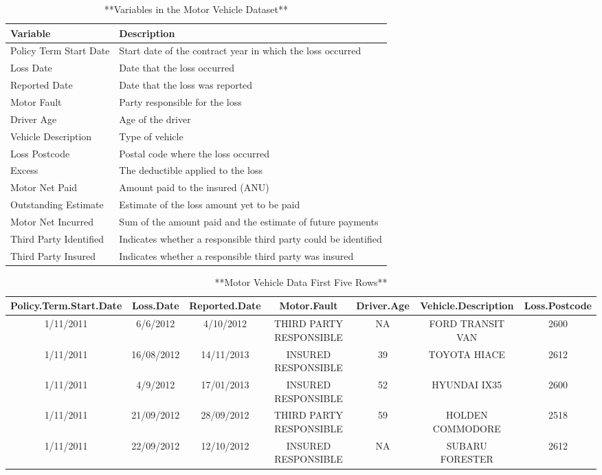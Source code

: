 \documentclass[
]{book}
\begin{document}
\begin{table}

\caption{\label{tab:DescribeAuto}**Variables in the Motor Vehicle Dataset**}
\centering
\begin{tabular}[t]{ll}
\toprule
Variable & Description\\
\midrule
Policy Term Start Date & Start date of the contract year in which the loss occurred\\
Loss Date & Date that the loss occurred\\
Reported Date & Date that the loss was reported\\
Motor Fault & Party responsible for the loss\\
Driver Age & Age of the driver\\
\addlinespace
Vehicle Description & Type of vehicle\\
Loss Postcode & Postal code where the loss occurred\\
Excess & The deductible applied to the loss\\
Motor Net Paid & Amount paid to the insured (ANU)\\
Outstanding Estimate & Estimate of the loss amount yet to be paid\\
\addlinespace
Motor Net Incurred & Sum of the amount paid and the estimate of future payments\\
Third Party Identified & Indicates whether a responsible third party could be identified\\
Third Party Insured & Indicates whether a responsible third party was insured\\
\bottomrule
\end{tabular}
\end{table}

\begin{table}

\caption{\label{tab:PrintNumAuto}**Motor Vehicle  Data First Five Rows**}
\centering
\begin{tabular}[t]{c|c|c|c|c|c|c}
\hline
Policy.Term.Start.Date & Loss.Date & Reported.Date & Motor.Fault & Driver.Age & Vehicle.Description & Loss.Postcode\\
\hline
1/11/2011 & 6/6/2012 & 4/10/2012 & THIRD PARTY RESPONSIBLE & NA & FORD TRANSIT VAN & 2600\\
\hline
1/11/2011 & 16/08/2012 & 14/11/2013 & INSURED RESPONSIBLE & 39 & TOYOTA HIACE & 2612\\
\hline
1/11/2011 & 4/9/2012 & 17/01/2013 & INSURED RESPONSIBLE & 52 & HYUNDAI IX35 & 2600\\
\hline
1/11/2011 & 21/09/2012 & 28/09/2012 & THIRD PARTY RESPONSIBLE & 59 & HOLDEN COMMODORE & 2518\\
\hline
1/11/2011 & 22/09/2012 & 12/10/2012 & INSURED RESPONSIBLE & NA & SUBARU FORESTER & 2612\\
\hline
\end{tabular}
\end{table}
\end{document}
